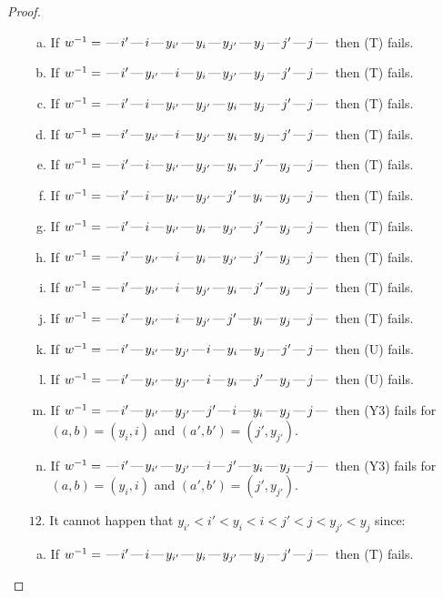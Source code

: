\documentclass[10pt]{article}
\theoremstyle{definition}
\theoremstyle{definition}
\def\dash{\text{\hspace{0.5mm}---\hspace{0.5mm}}}
\begin{document}
\begin{proof}
\begin{enumerate}
\begin{enumerate}[(a)]
\item If $w^{-1} = \dash i'\dash i\dash y_{i'}\dash y_i\dash y_{j'}\dash y_j\dash j'\dash j\dash $ then (T) fails.
\item If $w^{-1} = \dash i'\dash y_{i'}\dash i\dash y_i\dash y_{j'}\dash y_j\dash j'\dash j\dash $ then (T) fails.
\item If $w^{-1} = \dash i'\dash i\dash y_{i'}\dash y_{j'}\dash y_i\dash y_j\dash j'\dash j\dash $ then (T) fails.
\item If $w^{-1} = \dash i'\dash y_{i'}\dash i\dash y_{j'}\dash y_i\dash y_j\dash j'\dash j\dash $ then (T) fails.
\item If $w^{-1} = \dash i'\dash i\dash y_{i'}\dash y_{j'}\dash y_i\dash j'\dash y_j\dash j\dash $ then (T) fails.
\item If $w^{-1} = \dash i'\dash i\dash y_{i'}\dash y_{j'}\dash j'\dash y_i\dash y_j\dash j\dash $ then (T) fails.
\item If $w^{-1} = \dash i'\dash i\dash y_{i'}\dash y_i\dash y_{j'}\dash j'\dash y_j\dash j\dash $ then (T) fails.
\item If $w^{-1} = \dash i'\dash y_{i'}\dash i\dash y_i\dash y_{j'}\dash j'\dash y_j\dash j\dash $ then (T) fails.
\item If $w^{-1} = \dash i'\dash y_{i'}\dash i\dash y_{j'}\dash y_i\dash j'\dash y_j\dash j\dash $ then (T) fails.
\item If $w^{-1} = \dash i'\dash y_{i'}\dash i\dash y_{j'}\dash j'\dash y_i\dash y_j\dash j\dash $ then (T) fails.
\item If $w^{-1} = \dash i'\dash y_{i'}\dash y_{j'}\dash i\dash y_i\dash y_j\dash j'\dash j\dash $ then (U) fails.
\item If $w^{-1} = \dash i'\dash y_{i'}\dash y_{j'}\dash i\dash y_i\dash j'\dash y_j\dash j\dash $ then (U) fails.
\item If $w^{-1} = \dash i'\dash y_{i'}\dash y_{j'}\dash j'\dash i\dash y_i\dash y_j\dash j\dash $ then (Y3) fails for $(a,b)=(y_i,i)$ and $(a',b')=(j',y_{j'})$.
\item If $w^{-1} = \dash i'\dash y_{i'}\dash y_{j'}\dash i\dash j'\dash y_i\dash y_j\dash j\dash $ then (Y3) fails for $(a,b)=(y_i,i)$ and $(a',b')=(j',y_{j'})$.
\end{enumerate}
\item[$12$.] It cannot happen that $y_{i'} < i' < y_i < i < j' < j < y_{j'} < y_j$ since:
\begin{enumerate}[(a)]
\item If $w^{-1} = \dash i'\dash i\dash y_{i'}\dash y_i\dash y_{j'}\dash y_j\dash j'\dash j\dash $ then (T) fails.

\end{enumerate}
\end{enumerate}
\end{proof}
\end{document}
